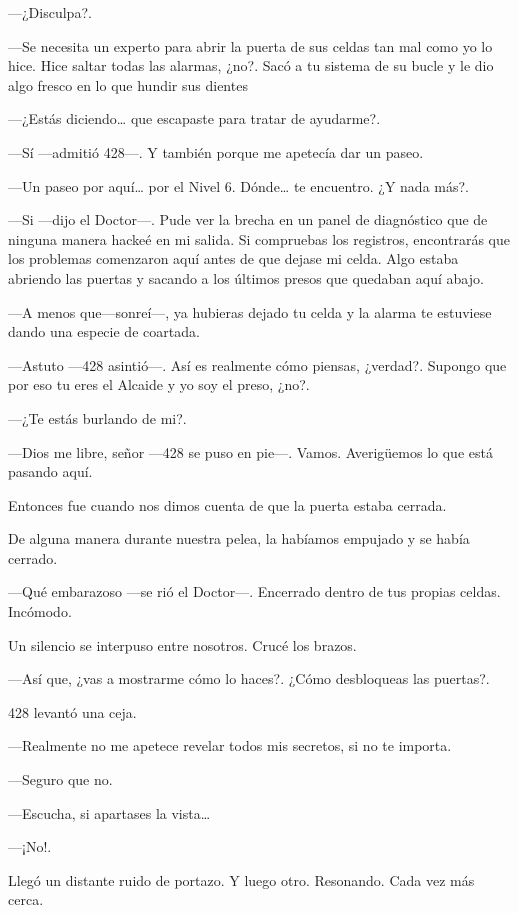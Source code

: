 ---¿Disculpa?.

---Se necesita un experto para abrir la puerta de sus celdas tan mal
como yo lo hice. Hice saltar todas las alarmas, ¿no?. Sacó a tu sistema
de su bucle y le dio algo fresco en lo que hundir sus dientes

---¿Estás diciendo\ldots{} que escapaste para tratar de ayudarme?.

---Sí ---admitió 428---. Y también porque me apetecía dar un paseo.

---Un paseo por aquí\ldots{} por el Nivel 6. Dónde\ldots{} te encuentro.
¿Y nada más?.

---Si ---dijo el Doctor---. Pude ver la brecha en un panel de
diagnóstico que de ninguna manera hackeé en mi salida. Si compruebas los
registros, encontrarás que los problemas comenzaron aquí antes de que
dejase mi celda. Algo estaba abriendo las puertas y sacando a los
últimos presos que quedaban aquí abajo.

---A menos que---sonreí---, ya hubieras dejado tu celda y la alarma te
estuviese dando una especie de coartada.

---Astuto ---428 asintió---. Así es realmente cómo piensas, ¿verdad?.
Supongo que por eso tu eres el Alcaide y yo soy el preso, ¿no?.

---¿Te estás burlando de mi?.

---Dios me libre, señor ---428 se puso en pie---. Vamos. Averigüemos lo
que está pasando aquí.

Entonces fue cuando nos dimos cuenta de que la puerta estaba cerrada.

De alguna manera durante nuestra pelea, la habíamos empujado y se había
cerrado.

---Qué embarazoso ---se rió el Doctor---. Encerrado dentro de tus
propias celdas. Incómodo.

Un silencio se interpuso entre nosotros. Crucé los brazos.

---Así que, ¿vas a mostrarme cómo lo haces?. ¿Cómo desbloqueas las
puertas?.

428 levantó una ceja.

---Realmente no me apetece revelar todos mis secretos, si no te importa.

---Seguro que no.

---Escucha, si apartases la vista\ldots{}

---¡No!.

Llegó un distante ruido de portazo. Y luego otro. Resonando. Cada vez
más cerca.

